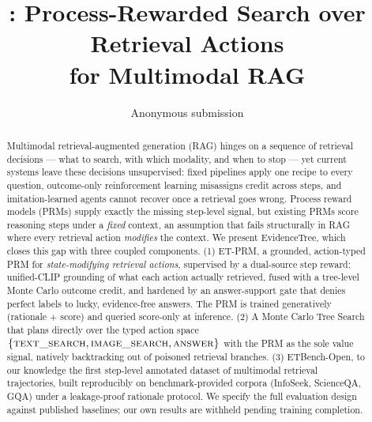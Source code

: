 \documentclass[letterpaper,twocolumn,10pt]{article}
\title{\textbf{\ours{}: Process-Rewarded Search over Retrieval Actions\\for Multimodal RAG}}
\author{Anonymous submission}
\date{}
\newcommand{\ours}{EvidenceTree}
\newcommand{\dataset}{ETBench-Open}
\newcommand{\prm}{ET-PRM}
\begin{document}
\maketitle

\begin{abstract}
Multimodal retrieval-augmented generation (RAG) hinges on a sequence of
retrieval decisions --- what to search, with which modality, and when to
stop --- yet current systems leave these decisions unsupervised: fixed
pipelines apply one recipe to every question, outcome-only reinforcement
learning misassigns credit across steps, and imitation-learned agents
cannot recover once a retrieval goes wrong. Process reward models (PRMs)
supply exactly the missing step-level signal, but existing PRMs score
reasoning steps under a \emph{fixed} context, an assumption that fails
structurally in RAG where every retrieval action \emph{modifies} the
context. We present \ours{}, which closes this gap with three coupled
components. (1) \prm{}, a grounded, action-typed PRM for
\emph{state-modifying retrieval actions}, supervised by a dual-source step
reward: unified-CLIP grounding of what each action actually retrieved,
fused with a tree-level Monte Carlo outcome credit, and hardened by an
answer-support gate that denies perfect labels to lucky, evidence-free
answers. The PRM is trained generatively (rationale + score) and queried
score-only at inference. (2) A Monte Carlo Tree Search that plans directly
over the typed action space $\{\textsc{text\_search},
\textsc{image\_search}, \textsc{answer}\}$ with the PRM as the sole value
signal, natively backtracking out of poisoned retrieval branches.
(3) \dataset{}, to our knowledge the first step-level annotated dataset of multimodal
retrieval trajectories, built reproducibly on benchmark-provided corpora
(InfoSeek, ScienceQA, GQA) under a leakage-proof rationale protocol. We
specify the full evaluation design against published baselines; our own
results are withheld pending training completion.
\end{abstract}
\end{document}
